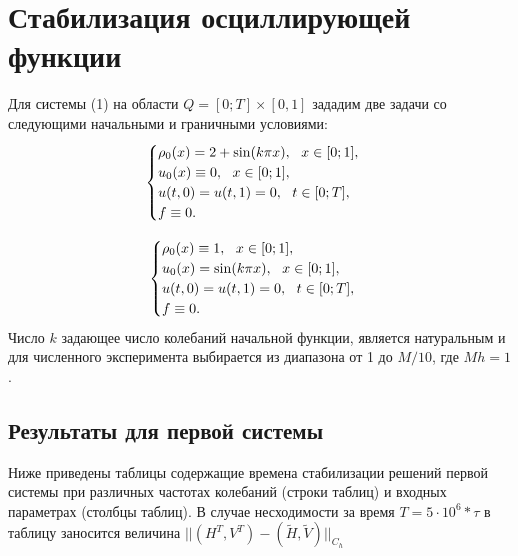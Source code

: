 \section{Стабилизация осциллирующей функции}

Для системы (1) на области $Q = [0; T] \times [0, 1]$ зададим две задачи со следующими начальными и граничными условиями:
\begin{equation}
	\begin{cases}
		$$
		\rho_0 (x) = 2 + \sin (k \pi x), \ \ x \in [0; 1],
		\\
		u_0 (x) \equiv 0, \ \ x \in [0; 1], 
		\\
		u (t, 0) = u (t, 1) = 0, \ \ t \in [0; T], 
		\\
		f \equiv 0.
		$$
	\end{cases}
\end{equation}

\begin{equation}
	\begin{cases}
		$$
		\rho_0 (x) \equiv 1, \ \ x \in [0; 1], 
		\\
		u_0 (x) = \sin (k \pi x), \ \ x \in [0; 1],
		\\
		u (t, 0) = u (t, 1) = 0, \ \ t \in [0; T],
		\\
		f \equiv 0.
		$$
	\end{cases}
\end{equation}
Число $k$ задающее число колебаний начальной функции, является натуральным и для численного эксперимента выбирается из диапазона от 1 до $M / 10$, где $Mh = 1$.

\subsection{Результаты для первой системы}
Ниже приведены таблицы содержащие времена стабилизации решений первой системы при различных частотах колебаний (строки таблиц) и входных параметрах (столбцы таблиц). В случае несходимости за время $T = 5 \cdot 10^6 * \tau$ в таблицу заносится величина $|| (H^T, V^T) - (\tilde{H}, \tilde{V})||_{C_h}$
